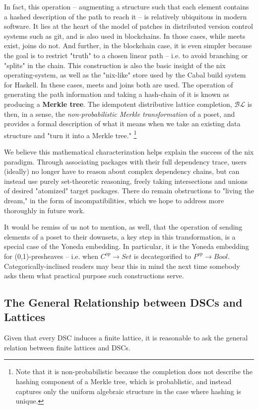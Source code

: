 \documentclass[hoptionsi,review,format=acmsmall]{acmart}
\theoremstyle{definition}
\newcommand{\BLc}{\mathcal{BL}}
\begin{document}
In fact, this operation -- augmenting a structure such that each element contains a hashed description of the path to reach it -- is relatively ubiquitous in modern software. It lies at the heart of the model of patches in distributed version control systems such as git, and is also used in blockchains. In those cases, while meets exist, joins do not. And further, in the blockchain case, it is even simpler because the goal is to restrict "truth" to a chosen linear path -- i.e. to avoid branching or "splits" in the chain. This construction is also the basic insight of the nix operating-system, as well as the "nix-like" store used by the Cabal build system for Haskell. In these cases, meets and joins both are used. The operation of generating the path information and taking a hash-chain of it is known as producing a \textbf{Merkle tree}\cite{merkle1987digital}. The idempotent distributive lattice completion, \(\BLc\) is then, in a sense,  the \textit{non-probabilistic Merkle transformation} of a poset, and provides a formal description of what it means when we take an existing data structure and "turn it into a Merkle tree." \footnote{Note that it is non-probabilistic because the completion does not describe the hashing component of a Merkle tree, which is probablistic, and instead captures only the uniform algebraic structure in the case where hashing is unique.} 

We believe this mathematical characterization helps explain the success of the nix paradigm. Through associating packages with their full dependency trace, users (ideally) no longer have to reason about complex dependency chains, but can instead use purely set-theoretic reasoning, freely taking intersections and unions of desired "atomized" target packages. There do remain obstructions to "living the dream," in the form of incompatibilities, which we hope to address more thoroughly in future work.

It would be remiss of us not to mention, as well, that the operation of sending elements of a poset to their downsets, a key step in this transformation, is a special case of the Yoneda embedding. In particular, it is the Yoneda embedding for (0,1)-presheaves -- i.e. when \(C^{op} \to Set\) is decategorified to \(P^{op} \to Bool\). Categorically-inclined readers may bear this in mind the next time somebody asks them what practical purpose such constructions serve.

\subsection{The General Relationship between DSCs and Lattices}
Given that every DSC induces a finite lattice, it is reasonable to ask the general relation between finite lattices and DSCs. 
\end{document}
